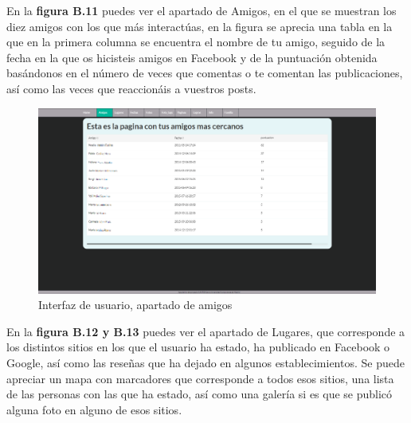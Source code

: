 En la \textbf{figura B.11} puedes ver el apartado de Amigos, en el que se muestran los diez amigos con los que más interactúas, en la figura se aprecia una tabla en la que en la primera columna se encuentra el nombre de tu amigo, seguido de la fecha en la que os hicisteis amigos en Facebook y de la puntuación obtenida basándonos en el número de veces que comentas o te comentan las publicaciones, así como las veces que reaccionáis a vuestros posts.

\begin{figure}
	\begin{center}
		\includegraphics[scale=0.3]{Imagenes/Fuentes/InterfazAmigos.png} \caption{Interfaz de usuario, apartado de amigos}
		\label{WebAplication2}
	\end{center}
\end{figure}

En la \textbf{figura B.12 y B.13} puedes ver el apartado de Lugares, que corresponde a los distintos sitios en los que el usuario ha estado, ha publicado en Facebook o Google, así como las reseñas que ha dejado en algunos establecimientos. Se puede apreciar un mapa con marcadores que corresponde a todos esos sitios, una lista de las personas con las que ha estado, así como una galería si es que se publicó alguna foto en alguno de esos sitios.

